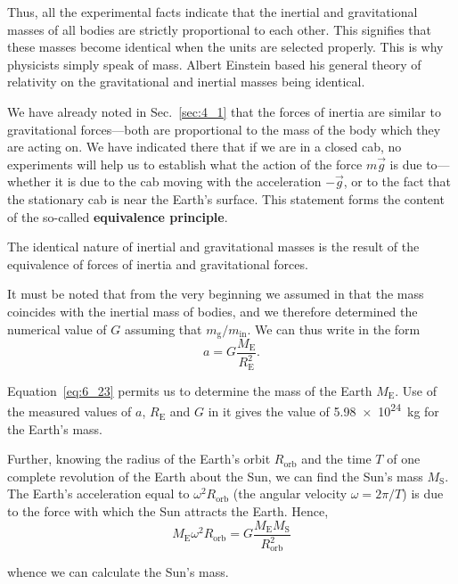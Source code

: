 Thus, all the experimental facts indicate that the inertial and gravitational masses of all bodies are strictly proportional to each other. This signifies that these masses become identical when the units are selected properly. This is why physicists simply speak of mass. Albert Einstein based his general theory of relativity on the gravitational and inertial masses being identical.

We have already noted in Sec.~\ref{sec:4_1} that the forces of inertia are similar to gravitational forces---both are proportional to the mass of the body which they are acting on. We have indicated there that if we are in a closed cab, no experiments will help us to establish what the action of the force $m\vec{g}$ is due to---whether it is due to the cab moving with the acceleration $-\vec{g}$, or to the fact that the stationary cab is near the Earth's surface. This statement forms the content of the so-called \textbf{equivalence principle}.

The identical nature of inertial and gravitational masses is the result of the equivalence of forces of inertia and gravitational forces.

It must be noted that from the very beginning we assumed in  that the mass coincides with the inertial mass of bodies, and we therefore determined the numerical value of $G$ assuming that $m_{\text{g}}/m_{\text{in}}$. We can thus write  in the form
\begin{equation}\label{eq:6_23}
	a = G\frac{M_{\text{E}}}{R_{\text{E}}^2}.
\end{equation}

\noindent
Equation~\eqref{eq:6_23} permits us to determine the mass of the Earth $M_{\text{E}}$. Use of the measured values of $a$, $R_{\text{E}}$ and $G$ in it gives the value of \SI{5.98e24}{\kilo\gram} for the Earth's mass.

Further, knowing the radius of the Earth's orbit $R_{\text{orb}}$ and the time $T$ of one complete revolution of the Earth about the Sun, we can find the Sun's mass $M_{\text{S}}$. The Earth's acceleration equal to $\omega^2R_{\text{orb}}$ (the angular velocity $\omega=2\pi/T$) is due to the force with which the Sun attracts the Earth. Hence,
\begin{equation*}
	M_{\text{E}}\omega^2R_{\text{orb}} = G\frac{M_{\text{E}}M_{\text{S}}}{R_{\text{orb}}^2}
\end{equation*}

\noindent
whence we can calculate the Sun's mass.

